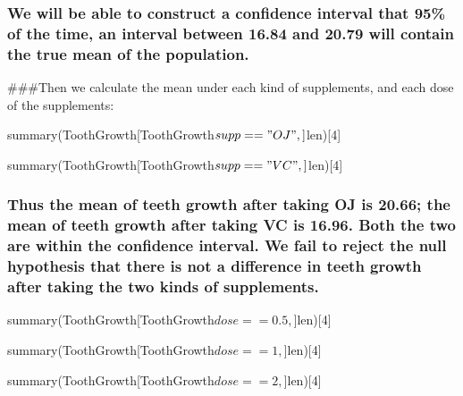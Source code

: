 \documentclass[
]{article}
\begin{document}
\hypertarget{we-will-be-able-to-construct-a-confidence-interval-that-95-of-the-time-an-interval-between-16.84-and-20.79-will-contain-the-true-mean-of-the-population.}{%
\subsubsection{We will be able to construct a confidence interval that
95\% of the time, an interval between 16.84 and 20.79 will contain the
true mean of the
population.}\label{we-will-be-able-to-construct-a-confidence-interval-that-95-of-the-time-an-interval-between-16.84-and-20.79-will-contain-the-true-mean-of-the-population.}}

\#\#\#Then we calculate the mean under each kind of supplements, and
each dose of the supplements:

summary(ToothGrowth{[}ToothGrowth\(supp == "OJ", ]\)len){[}4{]}

summary(ToothGrowth{[}ToothGrowth\(supp == "VC", ]\)len){[}4{]}

\hypertarget{thus-the-mean-of-teeth-growth-after-taking-oj-is-20.66-the-mean-of-teeth-growth-after-taking-vc-is-16.96.-both-the-two-are-within-the-confidence-interval.-we-fail-to-reject-the-null-hypothesis-that-there-is-not-a-difference-in-teeth-growth-after-taking-the-two-kinds-of-supplements.}{%
\subsubsection{Thus the mean of teeth growth after taking OJ is 20.66;
the mean of teeth growth after taking VC is 16.96. Both the two are
within the confidence interval. We fail to reject the null hypothesis
that there is not a difference in teeth growth after taking the two
kinds of
supplements.}\label{thus-the-mean-of-teeth-growth-after-taking-oj-is-20.66-the-mean-of-teeth-growth-after-taking-vc-is-16.96.-both-the-two-are-within-the-confidence-interval.-we-fail-to-reject-the-null-hypothesis-that-there-is-not-a-difference-in-teeth-growth-after-taking-the-two-kinds-of-supplements.}}

summary(ToothGrowth{[}ToothGrowth\(dose == 0.5, ]\)len){[}4{]}

summary(ToothGrowth{[}ToothGrowth\(dose == 1, ]\)len){[}4{]}

summary(ToothGrowth{[}ToothGrowth\(dose == 2, ]\)len){[}4{]}
\end{document}
